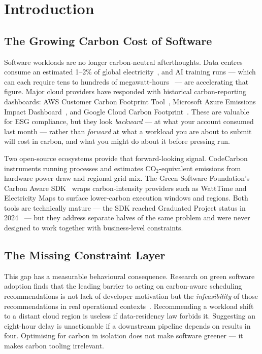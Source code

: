 ﻿\documentclass[conference]{IEEEtran}
\begin{document}
\section{Introduction}

\subsection{The Growing Carbon Cost of Software}

Software workloads are no longer carbon-neutral afterthoughts. Data centres consume
an estimated 1--2\% of global electricity~\cite{iea_datacenters}, and AI training
runs --- which can each require tens to hundreds of megawatt-hours~\cite{strubell2019energy}
--- are accelerating that figure.
Major cloud providers have responded with historical carbon-reporting dashboards:
AWS Customer Carbon Footprint Tool~\cite{aws_ccft_launch,aws_ccft_docs},
Microsoft Azure Emissions Impact Dashboard~\cite{esg_compare_techtarget},
and Google Cloud Carbon Footprint~\cite{esg_compare_techtarget}.
These are valuable for ESG compliance, but they look \emph{backward} --- at what
your account consumed last month --- rather than \emph{forward} at what a workload
you are about to submit will cost in carbon, and what you might do about it before
pressing run.

Two open-source ecosystems provide that forward-looking signal.
CodeCarbon~\cite{codecarbon_readme} instruments running processes and estimates
CO$_2$-equivalent emissions from hardware power draw and regional grid mix.
The Green Software Foundation's Carbon Aware SDK~\cite{carbonaware_overview} wraps
carbon-intensity providers such as WattTime and Electricity Maps to surface
lower-carbon execution windows and regions.
Both tools are technically mature --- the SDK reached Graduated Project status in
2024~\cite{carbonaware_graduation} --- but they address separate halves of the same
problem and were never designed to work together with business-level constraints.

\subsection{The Missing Constraint Layer}

This gap has a measurable behavioural consequence.
Research on green software adoption finds that the leading barrier to acting on
carbon-aware scheduling recommendations is not lack of developer motivation but the
\emph{infeasibility} of those recommendations in real operational
contexts~\cite{verdecchia2023greensoftware}.
Recommending a workload shift to a distant cloud region is useless if data-residency
law forbids it. Suggesting an eight-hour delay is unactionable if a downstream
pipeline depends on results in four.
Optimising for carbon in isolation does not make software greener --- it makes carbon
tooling irrelevant.
\end{document}
